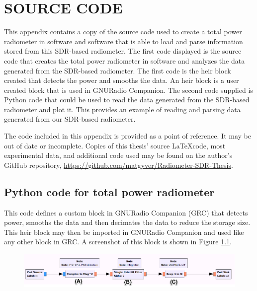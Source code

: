 \appendixtitle
\appendix
\chapter{SOURCE CODE} \label{appendix1}
This appendix contains a copy of the source code used to create a total power radiometer in software and software that is able to load and parse information stored from this SDR-based radiometer.  The first code displayed is the source code that creates the total power radiometer in software and analyzes the data generated from the SDR-based radiometer. The first code is the heir block created that detects the power and smooths the data.  An heir block is a user created block that is used in GNURadio Companion.  The second code supplied is Python code that could be used to read the data generated from the SDR-based radiometer and plot it.  This provides an example of reading and parsing data generated from our SDR-based radiometer.

The code included in this appendix is provided as a point of reference.  It may be out of date or incomplete.  Copies of this thesis' source \LaTeX code, most experimental data, and additional code used may be found on the author's GitHub repository, \url{https://github.com/matgyver/Radiometer-SDR-Thesis}.

\section*{Python code for total power radiometer}
This code defines a custom block in GNURadio Companion (GRC) that detects power, smooths the data and then decimates the data to reduce the storage size. This heir block may then be imported in GNURadio Companion and used like any other block in GRC.  A screenshot of this block is shown in Figure \ref{TPR_GRC}.

{\begin{figure}[h!tb] 
\centering
\includegraphics[width=0.8\linewidth]{Images/TPR_grc.png}
\label{TPR_GRC}
\end{figure}
}




